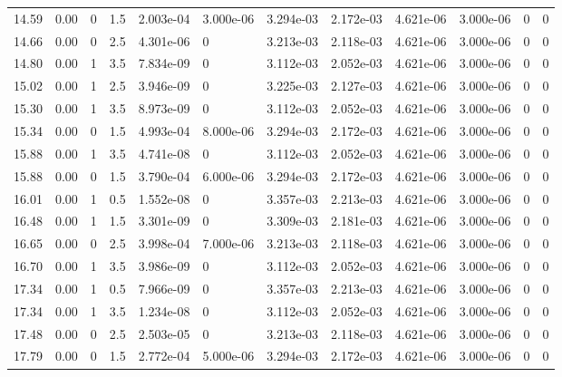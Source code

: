 \documentclass[preview]{standalone}
\begin{document}
{{{\begin{tabular}{L{1.2cm}C{1.2cm} C{0.3cm}C{0.5cm} C{1.4cm}C{1.4cm} C{1.4cm}C{1.4cm} C{1.6cm}C{1.6cm} C{1.6cm}C{1.6cm}}
  14.59  &  0.00  & 0     & 1.5 &  2.003e-04  & 3.000e-06  &  3.294e-03&   2.172e-03& 4.621e-06 & 3.000e-06   &  0 & 0  \\ 
  14.66  &  0.00  & 0     & 2.5 &  4.301e-06  & 0  &  3.213e-03&   2.118e-03& 4.621e-06 & 3.000e-06   &  0 & 0  \\ 
  14.80  &  0.00  & 1     & 3.5 &  7.834e-09  & 0  &  3.112e-03&   2.052e-03& 4.621e-06 & 3.000e-06   &  0 & 0  \\ 
  15.02  &  0.00  & 1     & 2.5 &  3.946e-09  & 0  &  3.225e-03&   2.127e-03& 4.621e-06 & 3.000e-06   &  0 & 0  \\ 
  15.30  &  0.00  & 1     & 3.5 &  8.973e-09  & 0  &  3.112e-03&   2.052e-03& 4.621e-06 & 3.000e-06   &  0 & 0  \\ 
  15.34  &  0.00  & 0     & 1.5 &  4.993e-04  & 8.000e-06  &  3.294e-03&   2.172e-03& 4.621e-06 & 3.000e-06   &  0 & 0  \\ 
  15.88  &  0.00  & 1     & 3.5 &  4.741e-08  & 0  &  3.112e-03&   2.052e-03& 4.621e-06 & 3.000e-06   &  0 & 0  \\ 
  15.88  &  0.00  & 0     & 1.5 &  3.790e-04  & 6.000e-06  &  3.294e-03&   2.172e-03& 4.621e-06 & 3.000e-06   &  0 & 0  \\ 
  16.01  &  0.00  & 1     & 0.5 &  1.552e-08  & 0  &  3.357e-03&   2.213e-03& 4.621e-06 & 3.000e-06   &  0 & 0  \\ 
  16.48  &  0.00  & 1     & 1.5 &  3.301e-09  & 0  &  3.309e-03&   2.181e-03& 4.621e-06 & 3.000e-06   &  0 & 0  \\ 
  16.65  &  0.00  & 0     & 2.5 &  3.998e-04  & 7.000e-06  &  3.213e-03&   2.118e-03& 4.621e-06 & 3.000e-06   &  0 & 0  \\ 
  16.70  &  0.00  & 1     & 3.5 &  3.986e-09  & 0  &  3.112e-03&   2.052e-03& 4.621e-06 & 3.000e-06   &  0 & 0  \\ 
  17.34  &  0.00  & 1     & 0.5 &  7.966e-09  & 0  &  3.357e-03&   2.213e-03& 4.621e-06 & 3.000e-06   &  0 & 0  \\ 
  17.34  &  0.00  & 1     & 3.5 &  1.234e-08  & 0  &  3.112e-03&   2.052e-03& 4.621e-06 & 3.000e-06   &  0 & 0  \\ 
  17.48  &  0.00  & 0     & 2.5 &  2.503e-05  & 0  &  3.213e-03&   2.118e-03& 4.621e-06 & 3.000e-06   &  0 & 0  \\ 
  17.79  &  0.00  & 0     & 1.5 &  2.772e-04  & 5.000e-06  &  3.294e-03&   2.172e-03& 4.621e-06 & 3.000e-06   &  0 & 0  \\ 
\hline 
\end{tabular} 

}}}
\end{document}
